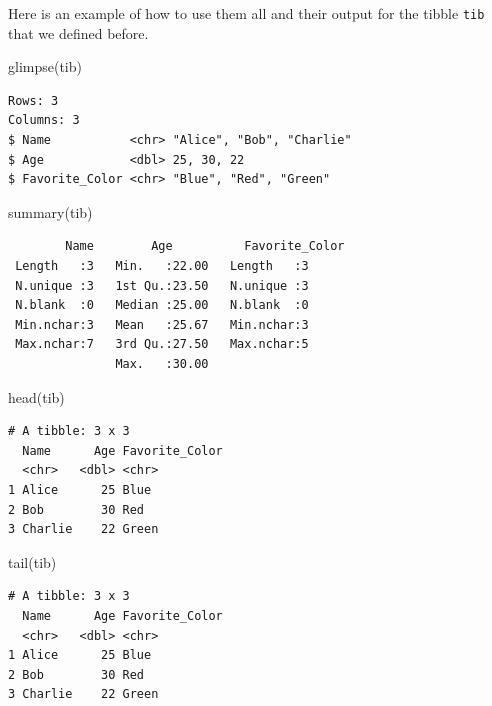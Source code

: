 \documentclass[
  letterpaper,
  DIV=11,
  numbers=noendperiod]{scrreprt}
\newenvironment{Shaded}{\begin{snugshade}}{\end{snugshade}}
\newcommand{\FunctionTok}[1]{\textcolor[rgb]{0.28,0.35,0.67}{#1}}
\newcommand{\NormalTok}[1]{\textcolor[rgb]{0.00,0.23,0.31}{#1}}
\begin{document}
Here is an example of how to use them all and their output for the
tibble \texttt{tib} that we defined before.

\begin{Shaded}
\begin{Highlighting}[]
\FunctionTok{glimpse}\NormalTok{(tib)}
\end{Highlighting}
\end{Shaded}

\begin{verbatim}
Rows: 3
Columns: 3
$ Name           <chr> "Alice", "Bob", "Charlie"
$ Age            <dbl> 25, 30, 22
$ Favorite_Color <chr> "Blue", "Red", "Green"
\end{verbatim}

\begin{Shaded}
\begin{Highlighting}[]
\FunctionTok{summary}\NormalTok{(tib)}
\end{Highlighting}
\end{Shaded}

\begin{verbatim}
        Name        Age          Favorite_Color
 Length   :3   Min.   :22.00   Length   :3     
 N.unique :3   1st Qu.:23.50   N.unique :3     
 N.blank  :0   Median :25.00   N.blank  :0     
 Min.nchar:3   Mean   :25.67   Min.nchar:3     
 Max.nchar:7   3rd Qu.:27.50   Max.nchar:5     
               Max.   :30.00                   
\end{verbatim}

\begin{Shaded}
\begin{Highlighting}[]
\FunctionTok{head}\NormalTok{(tib)}
\end{Highlighting}
\end{Shaded}

\begin{verbatim}
# A tibble: 3 x 3
  Name      Age Favorite_Color
  <chr>   <dbl> <chr>         
1 Alice      25 Blue          
2 Bob        30 Red           
3 Charlie    22 Green         
\end{verbatim}

\begin{Shaded}
\begin{Highlighting}[]
\FunctionTok{tail}\NormalTok{(tib)}
\end{Highlighting}
\end{Shaded}

\begin{verbatim}
# A tibble: 3 x 3
  Name      Age Favorite_Color
  <chr>   <dbl> <chr>         
1 Alice      25 Blue          
2 Bob        30 Red           
3 Charlie    22 Green         
\end{verbatim}
\end{document}
